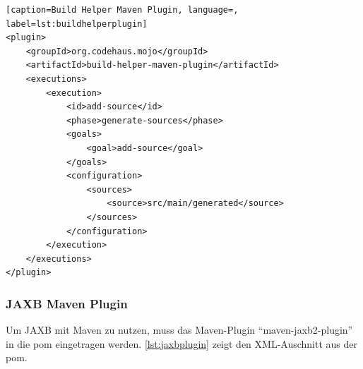 \begin{lstlisting}[caption=Build Helper Maven Plugin, language=, label=lst:buildhelperplugin]
<plugin>
    <groupId>org.codehaus.mojo</groupId>
    <artifactId>build-helper-maven-plugin</artifactId>
    <executions>
        <execution>
            <id>add-source</id>
            <phase>generate-sources</phase>
            <goals>
                <goal>add-source</goal>
            </goals>
            <configuration>
                <sources>
                    <source>src/main/generated</source>
                </sources>
            </configuration>
        </execution>
    </executions>
</plugin>
\end{lstlisting}

\subsubsection{JAXB Maven Plugin}

Um JAXB mit \gls{Maven} zu nutzen, muss das \gls{Maven}-Plugin \enquote{maven-jaxb2-plugin} in die \gls{pom} eingetragen werden. \autoref{lst:jaxbplugin} zeigt den XML-Auschnitt aus der \gls{pom}. 

